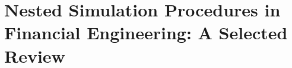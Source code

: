 \documentclass[9pt,handout]{beamer}
\begin{document}

\section[Nested Simulation Procedures]{Nested Simulation Procedures in Financial Engineering: A Selected Review}




\end{document}
